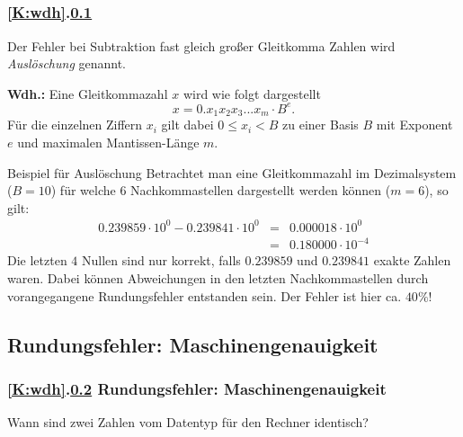 \documentclass[9pt,german]{beamer}%
\begin{document}
\subsection{\stitle}\label{S:rund}
\begin{frame}[t]%
 \frametitle{\ref{K:wdh}.\ref{S:rund} \stitle}

Der Fehler bei Subtraktion fast gleich gro\ss er Gleitkomma Zahlen wird \emph{Ausl\"oschung} genannt.
\medskip

\textbf{Wdh.: } Eine Gleitkommazahl $x$ wird wie folgt dargestellt
$$x = 0.x_1 x_2 x_3 ... x_m \cdot B^e.$$
F\"ur die einzelnen Ziffern $x_i$ gilt dabei $0 \leq x_i < B$ zu einer Basis $B$ mit Exponent $e$ und maximalen Mantissen-L\"ange $m$.
\begin{exampleblock}{Beispiel f\"ur Ausl\"oschung}
Betrachtet man eine Gleitkommazahl im Dezimalsystem ($B=10$) f\"ur welche $6$ Nachkommastellen dargestellt werden k\"onnen ($m=6$), so gilt:\\
\begin{eqnarray*}
0.239859 \cdot 10^0 - 0.239841 \cdot 10^0 &=& 0.000018 \cdot 10^0\\
 &=& 0.180000 \cdot 10^{-4}
\end{eqnarray*}
Die letzten $4$ Nullen sind nur korrekt, falls $0.239859$ und $0.239841$ exakte Zahlen waren.
Dabei k\"onnen Abweichungen in den letzten Nachkommastellen durch vorangegangene Rundungsfehler entstanden sein.
Der Fehler ist hier ca. $40\%$!
\medskip
\end{exampleblock}
\end{frame}

\def\stitle{Rundungsfehler: Maschinengenauigkeit}
\subsection{\stitle}\label{S:Maschinengenauigkeit}
\begin{frame}[t]%
 \frametitle{\ref{K:wdh}.\ref{S:Maschinengenauigkeit} \stitle}
\medskip

Wann sind zwei Zahlen vom Datentyp  f\"ur den Rechner identisch?


\end{frame}
\end{document}
